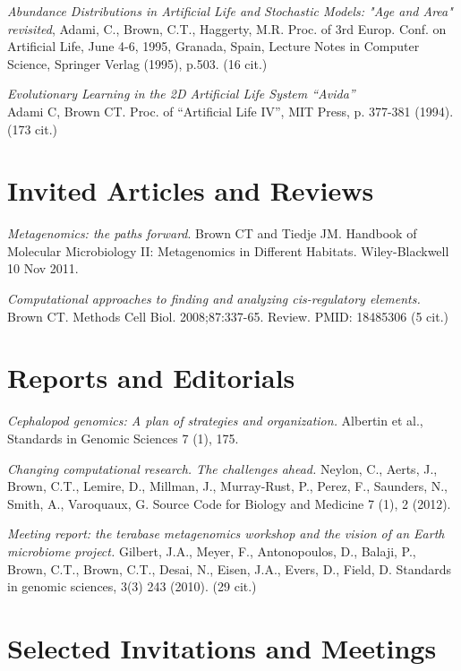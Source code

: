 \documentclass[margin,line]{resume}
\begin{document}
\begin{resume}
\newpage

{\em Abundance Distributions in Artificial Life and Stochastic Models: "Age and
Area" revisited}, Adami, C., Brown, C.T., Haggerty, M.R.
Proc. of 3rd Europ. Conf. on Artificial Life, June 4-6, 1995,
Granada, Spain, Lecture Notes in Computer Science, Springer Verlag (1995),
p.503. (16 cit.)

{\em Evolutionary Learning in the 2D Artificial Life System ``Avida''}\\
Adami C, Brown CT. Proc. of ``Artificial Life IV'', MIT Press, p. 377-381
(1994).  (173 cit.)

\section{\mysidestyle Invited Articles and Reviews}

{\em Metagenomics: the paths forward}.  Brown CT and Tiedje JM.
Handbook of Molecular Microbiology II: Metagenomics in Different
Habitats.  Wiley-Blackwell 10 Nov 2011.

{\em Computational approaches to finding and analyzing cis-regulatory elements.} 
Brown CT. Methods Cell Biol. 2008;87:337-65. Review.
PMID: 18485306  (5 cit.)

\section{\mysidestyle Reports and Editorials}

{\em Cephalopod genomics: A plan of strategies and organization.} Albertin et al., Standards in Genomic Sciences 7 (1), 175.

{\em Changing computational research. The challenges ahead.}
Neylon, C., Aerts, J., Brown, C.T., Lemire, D., Millman, J., Murray-Rust, P., Perez, F., Saunders, N., Smith, A., Varoquaux, G.
Source Code for Biology and Medicine 7 (1), 2 (2012).

{\em Meeting report: the terabase metagenomics workshop and the vision of an Earth microbiome project.}
Gilbert, J.A., Meyer, F., Antonopoulos, D., Balaji, P., Brown, C.T., Brown, C.T., Desai, N., Eisen, J.A., Evers, D., Field, D. Standards in genomic sciences, 3(3) 243 (2010). (29 cit.)

\section{\mysidestyle Selected Invitations and Meetings}

\begin{list1}


\end{list1}
\end{resume}
\end{document}
